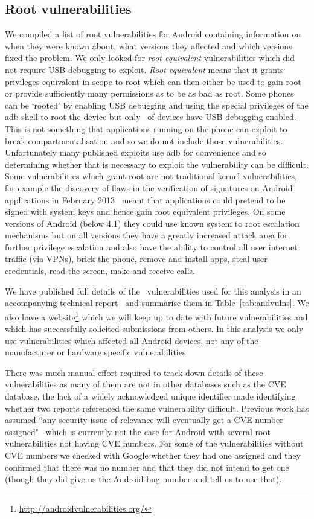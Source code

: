 \documentclass[conference,a4paper,twoside]{IEEEtran}
\begin{document}
\subsection{Root vulnerabilities}
We compiled a list of root vulnerabilities for Android containing information on when they were known about, what versions they affected and which versions fixed the problem.
We only looked for \emph{root equivalent} vulnerabilities which did not require USB debugging to exploit.
\emph{Root equivalent} means that it grants privileges equivalent in scope to root which can then either be used to gain root or provide sufficiently many permissions as to be as bad as root.
Some phones can be `rooted' by enabling USB debugging and using the special privileges of the adb shell to root the device but only \daAdbEnabledPerc\ of devices have USB debugging enabled.
This is not something that applications running on the phone can exploit to break compartmentalisation and so we do not include those vulnerabilities.
Unfortunately many published exploits use adb for convenience and so determining whether that is necessary to exploit the vulnerability can be difficult.
Some vulnerabilities which grant root are not traditional kernel vulnerabilities, for example the discovery of flaws in the verification of signatures on Android applications in February 2013~\cite{Forristal2013} meant that applications could pretend to be signed with system keys and hence gain root equivalent privileges.
On some versions of Android (below 4.1) they could use known system to root escalation mechanisms but on all versions they have a greatly increased attack area for further privilege escalation and also have the ability to control all user internet traffic (via VPNs), brick the phone, remove and install apps, steal user credentials, read the screen, make and receive calls.

We have published full details of the \daNumVulnsUsed\ vulnerabilities used for this analysis in an accompanying technical report~\cite{TODO} and summarise them in Table~\ref{tab:andvulns}.
We also have a website\footnote{\url{http://androidvulnerabilities.org/}} which we will keep up to date with future vulnerabilities and which has successfully solicited submissions from others.
In this analysis we only use vulnerabilities which affected all Android devices, not any of the manufacturer or hardware specific vulnerabilities

There was much manual effort required to track down details of these vulnerabilities as many of them are not in other databases such as the CVE database, the lack of a widely acknowledged unique identifier made identifying whether two reports referenced the same vulnerability difficult.
Previous work has assumed ``any security issue of relevance will eventually get a CVE number assigned"~\cite{Frei2010} which is currently not the case for Android with several root vulnerabilities not having CVE numbers.
For some of the vulnerabilities without CVE numbers we checked with Google whether they had one assigned and they confirmed that there was no number and that they did not intend to get one (though they did give us the Android bug number and tell us to use that).
\end{document}
